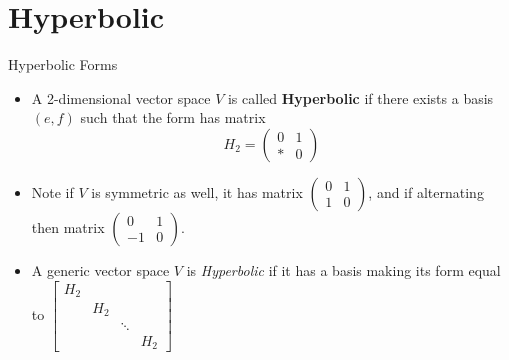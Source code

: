 \documentclass[svgnames]{beamer}
\begin{document}





\section{Hyperbolic}


\begin{frame}{Hyperbolic Forms}
\small
\begin{itemize}[<+->]
\item A 2-dimensional vector space $V$ is called \textbf{Hyperbolic} if there exists a basis $(e, f)$ such that the form has matrix 
\[H_2=\begin{pmatrix}
    0 & 1\\
    * & 0
\end{pmatrix}\]
\item Note if $V$ is symmetric as well, it has matrix $\begin{pmatrix}
    0 & 1\\
    1 & 0
\end{pmatrix}$, and if alternating then matrix $\begin{pmatrix}
    0 & 1\\
    -1 & 0
\end{pmatrix}$. 
\item A generic vector space $V$ is \textit{Hyperbolic} if it has a basis making its form equal to                $\begin{bmatrix}H_2 & &  &  \\ & H_2 &  &  \\ &  & \ddots &  \\ &  &  & H_2\end{bmatrix}$
\end{itemize}

\end{frame} 
\end{document}
